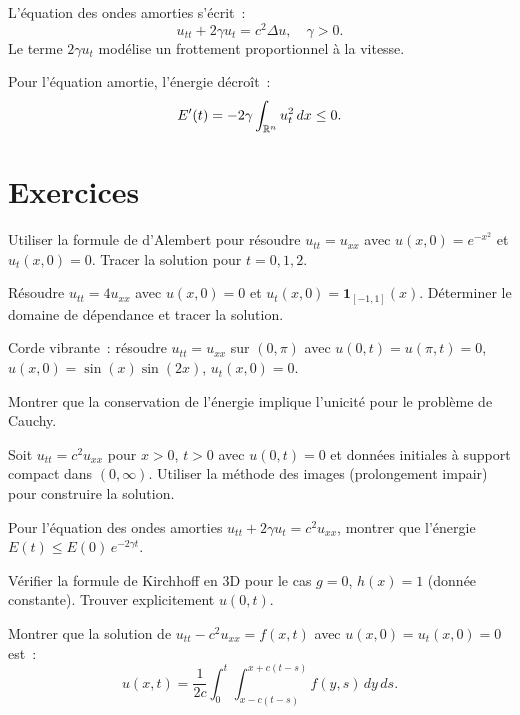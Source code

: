 L'\'equation des ondes amorties s'\'ecrit~:
\[
    u_{tt} + 2\gamma u_t = c^2 \Delta u, \quad \gamma > 0.
\]
Le terme $2\gamma u_t$ mod\'elise un frottement proportionnel \`a la vitesse.

\begin{proposition}
Pour l'\'equation amortie, l'\'energie d\'ecro\^it~:
\[
    E'(t) = -2\gamma \int_{\mathbb{R}^n} u_t^2\, dx \leq 0.
\]
\end{proposition}

\section{Exercices}

\begin{exercice}
Utiliser la formule de d'Alembert pour r\'esoudre $u_{tt} = u_{xx}$ avec
$u(x,0) = e^{-x^2}$ et $u_t(x,0) = 0$. Tracer la solution pour $t = 0, 1, 2$.
\end{exercice}

\begin{exercice}
R\'esoudre $u_{tt} = 4u_{xx}$ avec $u(x,0) = 0$ et
$u_t(x,0) = \mathbf{1}_{[-1,1]}(x)$. D\'eterminer le domaine de
d\'ependance et tracer la solution.
\end{exercice}

\begin{exercice}
Corde vibrante~: r\'esoudre $u_{tt} = u_{xx}$ sur $(0,\pi)$ avec
$u(0,t) = u(\pi,t) = 0$, $u(x,0) = \sin(x)\sin(2x)$, $u_t(x,0) = 0$.
\end{exercice}

\begin{exercice}
Montrer que la conservation de l'\'energie implique l'unicit\'e pour
le probl\`eme de Cauchy.
\end{exercice}

\begin{exercice}
Soit $u_{tt} = c^2 u_{xx}$ pour $x > 0$, $t > 0$ avec $u(0,t) = 0$ et
donn\'ees initiales \`a support compact dans $(0,\infty)$. Utiliser la
m\'ethode des images (prolongement impair) pour construire la solution.
\end{exercice}

\begin{exercice}
Pour l'\'equation des ondes amorties $u_{tt} + 2\gamma u_t = c^2 u_{xx}$,
montrer que l'\'energie $E(t) \leq E(0)\, e^{-2\gamma t}$.
\end{exercice}

\begin{exercice}
V\'erifier la formule de Kirchhoff en 3D pour le cas $g = 0$,
$h(x) = 1$ (donn\'ee constante). Trouver explicitement $u(0,t)$.
\end{exercice}

\begin{exercice}
Montrer que la solution de $u_{tt} - c^2 u_{xx} = f(x,t)$ avec
$u(x,0) = u_t(x,0) = 0$ est~:
\[
    u(x,t) = \frac{1}{2c}\int_0^t \int_{x-c(t-s)}^{x+c(t-s)} f(y,s)\, dy\, ds.
\]
\end{exercice}
